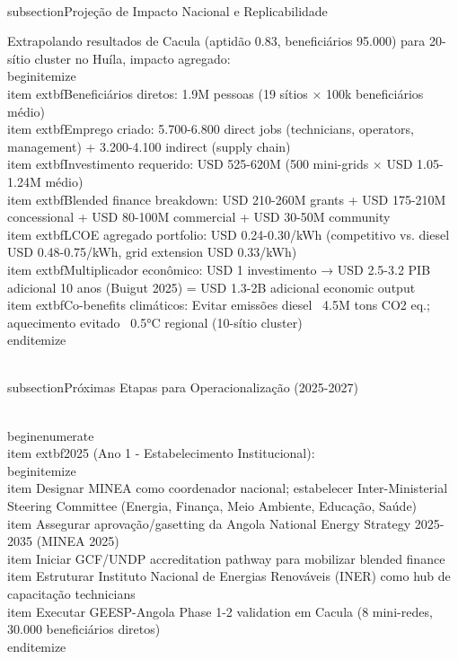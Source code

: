 \documentclass[12pt, a4paper]{article}
\begin{document}
{{{{{{{{{{{{\\subsection{Projeção de Impacto Nacional e Replicabilidade}

Extrapolando resultados de Cacula (aptidão 0.83, beneficiários 95.000) para 20-sítio cluster no Huíla, impacto agregado:
\\begin{itemize}
\\item 	extbf{Beneficiários diretos}: 1.9M pessoas (19 sítios × 100k beneficiários médio)
\\item 	extbf{Emprego criado}: 5.700-6.800 direct jobs (technicians, operators, management) + 3.200-4.100 indirect (supply chain)
\\item 	extbf{Investimento requerido}: USD 525-620M (500 mini-grids × USD 1.05-1.24M médio)
\\item 	extbf{Blended finance breakdown}: USD 210-260M grants + USD 175-210M concessional + USD 80-100M commercial + USD 30-50M community
\\item 	extbf{LCOE agregado portfolio}: USD 0.24-0.30/kWh (competitivo vs. diesel USD 0.48-0.75/kWh, grid extension USD 0.33/kWh)
\\item 	extbf{Multiplicador econômico}: USD 1 investimento → USD 2.5-3.2 PIB adicional 10 anos (Buigut 2025) = USD 1.3-2B adicional economic output
\\item 	extbf{Co-benefits climáticos}: Evitar emissões diesel ~4.5M tons CO2 eq.; aquecimento evitado ~0.5°C regional (10-sítio cluster)
\\end{itemize}

\\subsection{Próximas Etapas para Operacionalização (2025-2027)}

\\begin{enumerate}
\\item 	extbf{2025 (Ano 1 - Estabelecimento Institucional)}:
  \\begin{itemize}
    \\item Designar MINEA como coordenador nacional; estabelecer Inter-Ministerial Steering Committee (Energia, Finança, Meio Ambiente, Educação, Saúde)
    \\item Assegurar aprovação/gasetting da Angola National Energy Strategy 2025-2035 (MINEA 2025)
    \\item Iniciar GCF/UNDP accreditation pathway para mobilizar blended finance
    \\item Estruturar Instituto Nacional de Energias Renováveis (INER) como hub de capacitação technicians
    \\item Executar GEESP-Angola Phase 1-2 validation em Cacula (8 mini-redes, 30.000 beneficiários diretos)
  \\end{itemize}

}}}}}}}}}}}}
\end{document}
